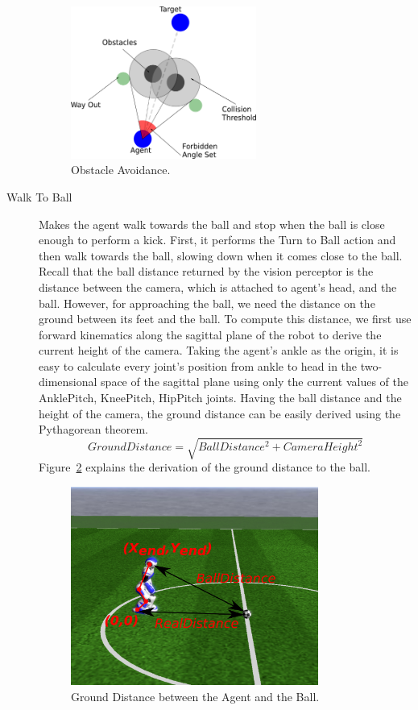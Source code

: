 \begin{description}
 \begin{figure}[t!]
  \centering
  \includegraphics[width=0.6\textwidth]{Chapter3/figures/ObstacleAvoidance.pdf}
  \caption{Obstacle Avoidance.}
  \label{fig:ObstacleAvoidance}
\end{figure} 


 \item[Walk To Ball] Makes the agent walk towards the ball and stop when the ball is close enough to perform a kick. First, it performs the Turn to Ball action and then walk towards the ball, slowing down when it comes close to the ball. Recall that the ball distance returned by the vision perceptor is the distance between the camera, which is attached to agent's head, and the ball. However, for approaching the ball, we need the distance on the ground between its feet and the ball. To compute this distance, we first use forward kinematics along the sagittal plane of the robot to derive the current height of the camera. Taking the agent's ankle as the origin, it is easy to calculate every joint's position from ankle to head in the two-dimensional space of the sagittal plane using only the current values of the AnklePitch, KneePitch, HipPitch joints. Having the ball distance and the height of the camera, the ground distance can be easily derived using the Pythagorean theorem. 
\[
GroundDistance = \sqrt{BallDistance^2 + CameraHeight^2}
\]
Figure~\ref{fig:2dkinematics} explains the derivation of the ground distance to the ball.
 
 \begin{figure}[t!]
\centering
  \includegraphics[trim=0cm 4cm 0cm 4cm,clip,width=0.8\textwidth]   {Chapter3/figures/2dkinematics.pdf}
  \caption{Ground Distance between the Agent and the Ball.}
  \label{fig:2dkinematics}
\end{figure}



\end{description}
